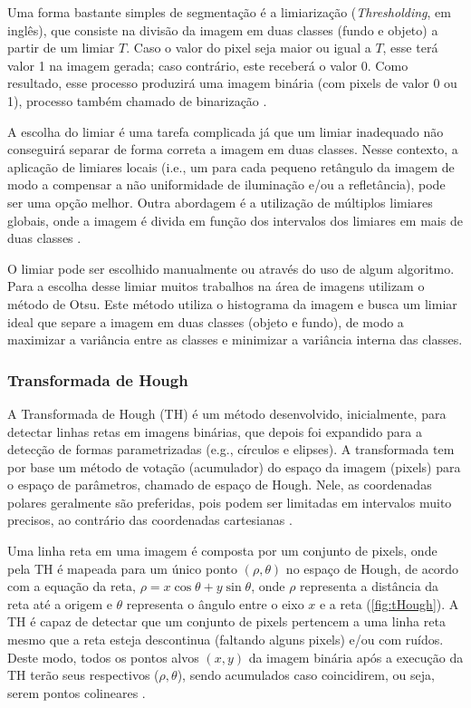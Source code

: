 \documentclass[12pt, a4paper, english, brazil]{article}
\begin{document}
Uma forma bastante simples de segmentação é a limiarização (\textit{Thresholding}, em inglês), que consiste na divisão da imagem em duas classes (fundo e objeto) a partir de um limiar $T$. Caso o valor do pixel seja maior ou igual a $T$, esse terá valor 1 na imagem gerada; caso contrário, este receberá o valor 0. Como resultado, esse processo produzirá uma imagem binária (com pixels de valor 0 ou 1), processo também chamado de binarização \cite{Marques_Filho_1999}.

A escolha do limiar é uma tarefa complicada já que um limiar inadequado não conseguirá separar de forma correta a imagem em duas classes. Nesse contexto, a aplicação de limiares locais (i.e., um para cada pequeno retângulo da imagem de modo a compensar a não uniformidade de iluminação e/ou a refletância), pode ser uma opção melhor. Outra abordagem é a utilização de múltiplos limiares globais, onde a imagem é divida em função dos intervalos dos limiares em mais de duas classes \cite{Gonzalez_Woods_2010}.

O limiar pode ser escolhido manualmente ou através do uso de algum algoritmo. Para a escolha desse limiar muitos trabalhos na área de imagens utilizam o método de Otsu. Este método \cite{Otsu_1979} utiliza o histograma da imagem e busca um limiar ideal que separe a imagem em duas classes (objeto e fundo), de modo a maximizar a variância entre as classes e minimizar a variância interna das classes.

\subsubsection{Transformada de Hough}

A Transformada de Hough (TH) é um método desenvolvido, inicialmente, para detectar linhas retas em imagens binárias, que depois foi expandido para a detecção de formas parametrizadas (e.g., círculos e elipses). A transformada tem por base um método de votação (acumulador) do espaço da imagem (pixels) para o espaço de parâmetros, chamado de espaço de Hough. Nele, as coordenadas polares geralmente são preferidas, pois podem ser limitadas em intervalos muito precisos, ao contrário das coordenadas cartesianas \cite{Bah_2020}.

Uma linha reta em uma imagem é composta por um conjunto de pixels, onde pela TH é mapeada para um único ponto $(\rho, \theta)$ no espaço de Hough, de acordo com a equação da reta, $\rho = x \cos \theta + y \sin \theta$, onde $\rho$ representa a distância da reta até a origem e $\theta$ representa o ângulo entre o eixo $x$ e a reta (\autoref{fig:tHough}). A TH é capaz de detectar que um conjunto de pixels pertencem a uma linha reta mesmo que a reta esteja descontinua (faltando alguns pixels) e/ou com ruídos. Deste modo, todos os pontos alvos $(x, y)$ da imagem binária após a execução da TH terão seus respectivos ($\rho, \theta$), sendo acumulados caso coincidirem, ou seja, serem pontos colineares \cite{Huiying_2015}.
\end{document}
